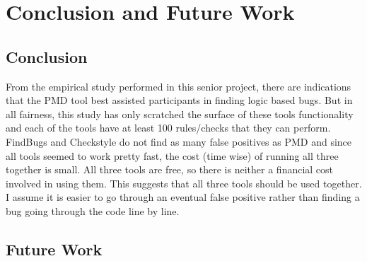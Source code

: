 %
%
%

\chapter{Conclusion and Future Work}\label{ch:conclusion}




\section{Conclusion}

From the empirical study performed in this senior project, there are indications that the PMD tool best assisted participants in finding logic based bugs. But in all fairness, this study has only scratched the surface of these tools functionality and each of the tools have at least 100 rules/checks that they can perform. FindBugs and Checkstyle do not find as many false positives as PMD and since all tools seemed to work pretty fast, the cost (time wise) of running all three together is small. All three tools are free, so there is neither a financial cost involved in using them. This suggests that all three tools should be used together. I assume it is easier to go through an eventual false positive rather than finding a bug going through the code line by line.






\section{Future Work}

